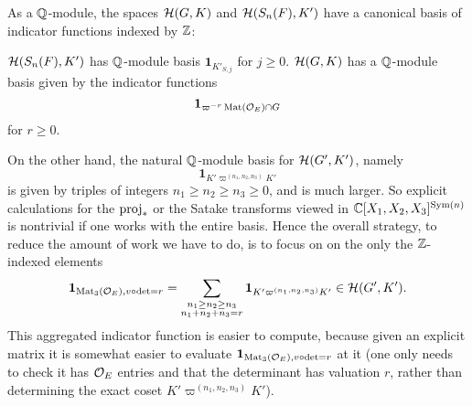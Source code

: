 As a $\mathbb Q$-module, the spaces $\mathcal H(G,K)$ and $\mathcal H(S_n(F), K')$
have a canonical basis of indicator functions indexed by $\mathbb Z$:
\begin{itemize}
  \ii $\mathcal H(S_n(F), K')$ has $\mathbb Q$-module basis $\mathbf{1}_{K'_{S,j}}$ for $j \ge 0$.
  \ii $\mathcal H(G,K)$ has a $\mathbb Q$-module basis given by the indicator functions
  \[ \mathbf{1}_{\varpi^{-r} \operatorname{Mat}(\mathcal O_E) \cap G} \]
  for $r \ge 0$.
\end{itemize}
On the other hand, the natural $\mathbb Q$-module basis for $\mathcal H(G', K')$, namely
\[ \mathbf{1}_{K'\varpi^{(n_1, n_2, n_3)}K'} \]
is given by triples of integers $n_1 \ge n_2 \ge n_3 \ge 0$, and is much larger.
So explicit calculations for the $\operatorname{proj}_\ast$ or the Satake transforms viewed in
$\mathbb C[X_1, X_2, X_3]^{\operatorname{Sym}(n)}$ is nontrivial if one works with the entire basis.
Hence the overall strategy, to reduce the amount of work we have to do,
is to focus on on the only the $\mathbb Z$-indexed elements
\[
  \mathbf{1}_{\operatorname{Mat}_3(\mathcal O_E), v\circ\det=r}
  = \sum_{\substack{n_1 \ge n_2 \ge n_3 \\ n_1 + n_2 + n_3 = r}}
  \mathbf{1}_{K'\varpi^{(n_1, n_2, n_3)}K'} \in \mathcal H(G', K').
\]
This aggregated indicator function is easier to compute,
because given an explicit matrix it is somewhat easier
to evaluate $\mathbf{1}_{\operatorname{Mat}_3(\mathcal O_E), v\circ\det=r}$
at it (one only needs to check it has $\mathcal O_E$ entries
and that the determinant has valuation $r$,
rather than determining the exact coset $K'\varpi^{(n_1, n_2, n_3)}K'$).

